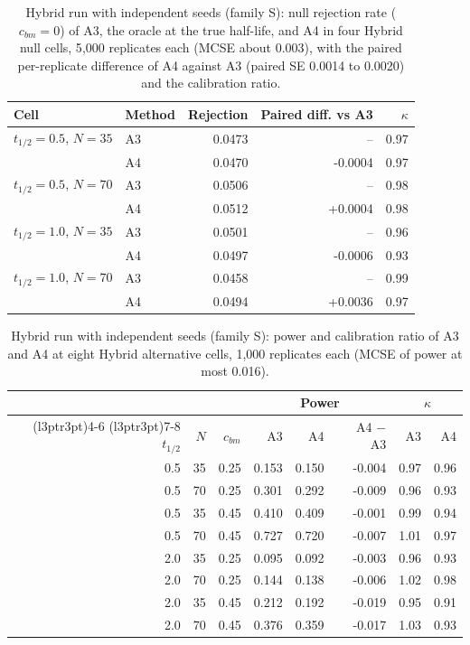 \documentclass[
  11pt,
]{article}
\begin{document}
\begin{table}
\centering
\caption{\label{tab:stage3-variants-null}Hybrid run with independent seeds (family S): null
      rejection rate ($c_{bm} = 0$) of A3, the oracle at the true
      half-life, and A4 in four Hybrid null cells, 5{,}000 replicates
      each (MCSE about 0.003), with the paired per-replicate
      difference of A4 against A3 (paired SE 0.0014 to 0.0020) and the calibration ratio.}
\centering
\fontsize{8}{10}\selectfont
\begin{tabular}[t]{llrrr}
\toprule
Cell & Method & Rejection & Paired diff. vs A3 & $\kappa$\\
\midrule
$t_{1/2} = 0.5$, $N = 35$ & A3 & 0.0473 & -- & 0.97\\
 & A4 & 0.0470 & -0.0004 & 0.97\\
$t_{1/2} = 0.5$, $N = 70$ & A3 & 0.0506 & -- & 0.98\\
 & A4 & 0.0512 & +0.0004 & 0.98\\
$t_{1/2} = 1.0$, $N = 35$ & A3 & 0.0501 & -- & 0.96\\
 & A4 & 0.0497 & -0.0006 & 0.93\\
$t_{1/2} = 1.0$, $N = 70$ & A3 & 0.0458 & -- & 0.99\\
 & A4 & 0.0494 & +0.0036 & 0.97\\
\bottomrule
\end{tabular}
\end{table}

\begin{table}
\centering
\caption{\label{tab:stage3-variants-alt}Hybrid run with independent seeds (family S): power and
      calibration ratio of A3 and A4 at eight Hybrid alternative cells,
      1{,}000 replicates each (MCSE of power at most 0.016).}
\centering
\fontsize{9}{11}\selectfont
\begin{tabular}[t]{rrrrrrrr}
\toprule
\multicolumn{3}{c}{ } & \multicolumn{3}{c}{Power} & \multicolumn{2}{c}{$\kappa$} \\
\cmidrule(l{3pt}r{3pt}){4-6} \cmidrule(l{3pt}r{3pt}){7-8}
$t_{1/2}$ & $N$ & $c_{bm}$ & A3 & A4 & A4 $-$ A3 & A3 & A4\\
\midrule
0.5 & 35 & 0.25 & 0.153 & 0.150 & -0.004 & 0.97 & 0.96\\
0.5 & 70 & 0.25 & 0.301 & 0.292 & -0.009 & 0.96 & 0.93\\
0.5 & 35 & 0.45 & 0.410 & 0.409 & -0.001 & 0.99 & 0.94\\
0.5 & 70 & 0.45 & 0.727 & 0.720 & -0.007 & 1.01 & 0.97\\
2.0 & 35 & 0.25 & 0.095 & 0.092 & -0.003 & 0.96 & 0.93\\
2.0 & 70 & 0.25 & 0.144 & 0.138 & -0.006 & 1.02 & 0.98\\
2.0 & 35 & 0.45 & 0.212 & 0.192 & -0.019 & 0.95 & 0.91\\
2.0 & 70 & 0.45 & 0.376 & 0.359 & -0.017 & 1.03 & 0.93\\
\bottomrule
\end{tabular}
\end{table}
\end{document}
